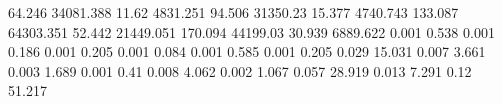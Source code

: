 64.246     34081.388  %
11.62      4831.251   %
94.506     31350.23   %
15.377     4740.743   %
133.087    64303.351  %
52.442     21449.051  %
170.094    44199.03   %
30.939     6889.622   %
0.001      0.538      %
0.001      0.186      %
0.001      0.205      %
0.001      0.084      %
0.001      0.585      %
0.001      0.205      %
0.029      15.031     %
0.007      3.661      %
0.003      1.689      %
0.001      0.41       %
0.008      4.062      %
0.002      1.067      %
0.057      28.919     %
0.013      7.291      %
0.12       51.217     %
